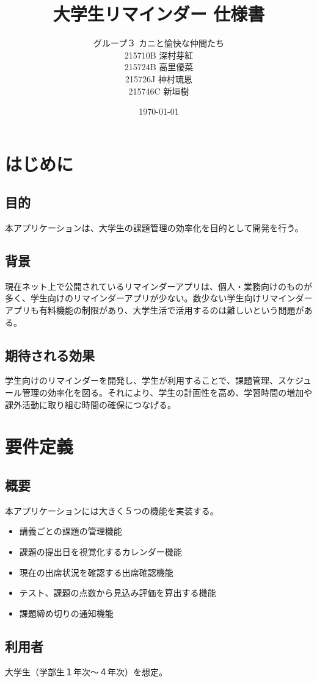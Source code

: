\documentclass[a4paper, 11pt, titlepage]{jsarticle}
\title{大学生リマインダー 仕様書}
\author{グループ３ カニと愉快な仲間たち\\215710B 深村芽紅\\215724B 高里優菜\\215726J 神村琉恩\\215746C 新垣樹}
\date{\today }
\begin{document}
\maketitle
\clearpage

\tableofcontents
\clearpage

\section{はじめに}
\subsection{目的}
本アプリケーションは、大学生の課題管理の効率化を目的として開発を行う。
\subsection{背景}
現在ネット上で公開されているリマインダーアプリは、個人・業務向けのものが多く、学生向けのリマインダーアプリが少ない。数少ない学生向けリマインダーアプリも有料機能の制限があり、大学生活で活用するのは難しいという問題がある。
\subsection{期待される効果}
学生向けのリマインダーを開発し、学生が利用することで、課題管理、スケジュール管理の効率化を図る。それにより、学生の計画性を高め、学習時間の増加や課外活動に取り組む時間の確保につなげる。

\section{要件定義}
\subsection{概要}
本アプリケーションには大きく５つの機能を実装する。
\begin{itemize}
\item 講義ごとの課題の管理機能
\item 課題の提出日を視覚化するカレンダー機能
\item 現在の出席状況を確認する出席確認機能
\item テスト、課題の点数から見込み評価を算出する機能
\item 課題締め切りの通知機能
\end{itemize}

\subsection{利用者}
大学生（学部生１年次〜４年次）を想定。
\end{document}
